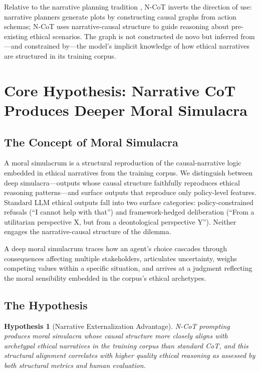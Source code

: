 \documentclass[11pt,letterpaper]{article}
\theoremstyle{defn}
\newtheorem{hypothesis}{Hypothesis}
\begin{document}
Relative to the narrative planning tradition \citep{riedl2010}, N-CoT inverts the direction of use: narrative planners generate plots by constructing causal graphs from action schemas; N-CoT uses narrative-causal structure to guide reasoning about pre-existing ethical scenarios. The graph is not constructed de novo but inferred from---and constrained by---the model's implicit knowledge of how ethical narratives are structured in its training corpus.

\section{Core Hypothesis: Narrative CoT Produces Deeper Moral Simulacra}

\subsection{The Concept of Moral Simulacra}

A moral simulacrum is a structural reproduction of the causal-narrative logic embedded in ethical narratives from the training corpus. We distinguish between deep simulacra---outputs whose causal structure faithfully reproduces ethical reasoning patterns---and surface outputs that reproduce only policy-level features. Standard LLM ethical outputs fall into two surface categories: policy-constrained refusals (``I cannot help with that'') and framework-hedged deliberation (``From a utilitarian perspective X, but from a deontological perspective Y''). Neither engages the narrative-causal structure of the dilemma.

A deep moral simulacrum traces how an agent's choice cascades through consequences affecting multiple stakeholders, articulates uncertainty, weighs competing values within a specific situation, and arrives at a judgment reflecting the moral sensibility embedded in the corpus's ethical archetypes.

\subsection{The Hypothesis}

\begin{hypothesis}[Narrative Externalization Advantage]
N-CoT prompting produces moral simulacra whose causal structure more closely aligns with archetypal ethical narratives in the training corpus than standard CoT, and this structural alignment correlates with higher quality ethical reasoning as assessed by both structural metrics and human evaluation.
\end{hypothesis}
\end{document}
